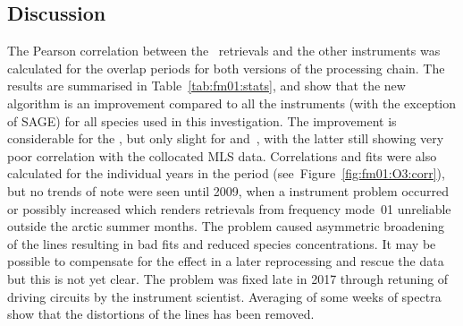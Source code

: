 \subsection{Discussion}
\label{sec:fm01:discussion}
The Pearson correlation between the \smr\ retrievals and the other instruments
was calculated for the overlap periods for both versions of the processing
chain.  The results are summarised in Table~\ref{tab:fm01:stats}, and show that
the new algorithm is an improvement compared to all the instruments (with the
exception of SAGE) for all species used in this investigation. The improvement
is considerable for the , but only slight for 
and~, with the latter still showing very poor correlation with the
collocated MLS data. Correlations and fits were also calculated for the
individual years in the period (see~Figure~\ref{fig:fm01:O3:corr}), but no
trends of note were seen until 2009, when a instrument problem occurred or
possibly increased which renders retrievals from frequency mode~01 unreliable
outside the arctic summer months.  The problem caused asymmetric broadening of
the lines resulting in bad fits and reduced species concentrations. It may be
possible to compensate for the effect in a later reprocessing and rescue the
data but this is not yet clear. The problem was fixed late in 2017 through
retuning of driving circuits by the instrument scientist.  Averaging of some
weeks of spectra show that the distortions of the lines has been removed.


